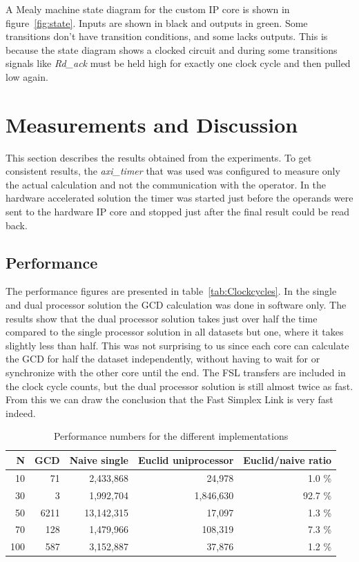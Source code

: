 \documentclass[11pt]{article}
\begin{document}
A Mealy machine state diagram for the custom IP core is shown in figure~\ref{fig:state}. Inputs are shown in black and outputs in green. Some transitions don't have transition conditions, and some lacks outputs. This is because the state diagram shows a clocked circuit and during some transitions signals like \emph{Rd\_ack} must be held high for exactly one clock cycle and then pulled low again.

\section{Measurements and Discussion\label{sec:measurements}}
This section describes the results obtained from the experiments. To get consistent results, the \emph{axi\_timer} that was used was configured to measure only the actual calculation and not the communication with the operator. In the hardware accelerated solution the timer was started just before the operands were sent to the hardware IP core and stopped just after the final result could be read back.

\subsection{Performance}
The performance figures are presented in table~\ref{tab:Clockcycles}. In the single and dual processor solution the GCD calculation was done in software only. The results show that the dual processor solution takes just over half the time compared to the single processor solution in all datasets but one, where it takes slightly less than half. This was not surprising to us since each core can calculate the GCD for half the dataset independently, without having to wait for or synchronize with the other core until the end. The FSL transfers are included in the clock cycle counts, but the dual processor solution is still almost twice as fast. From this we can draw the conclusion that the Fast Simplex Link is very fast indeed.

\begin{table}
  \centering
   \begin{tabular}{rr|rrr}
     \toprule
     N & GCD & Naive single & Euclid uniprocessor & Euclid/naive ratio \\
     \midrule
     10 & 71 & 2,433,868 & 24,978 & 1.0 \% \\
     30 & 3 & 1,992,704 & 1,846,630 & 92.7 \% \\
     50 & 6211 & 13,142,315 & 17,097 & 1.3 \% \\
     70 & 128 & 1,479,966 & 108,319 & 7.3 \% \\
     100 & 587 & 3,152,887 & 37,876 & 1.2 \% \\
     \bottomrule
   \end{tabular}
   \caption{Performance numbers for the different implementations}
   \label{tab:naive-uni}
\end{table}
\end{document}
